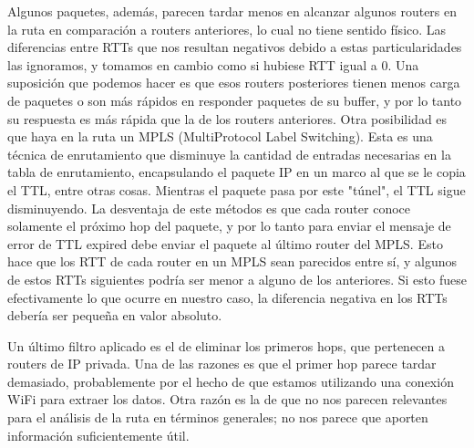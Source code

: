 Algunos paquetes, además, parecen tardar menos en alcanzar algunos routers en la
ruta en comparación a routers anteriores, lo cual no tiene sentido físico. Las
diferencias entre RTTs que nos resultan negativos debido a estas
particularidades las ignoramos, y tomamos en cambio como si hubiese RTT igual a
0. Una suposición que podemos hacer es que esos routers posteriores tienen menos
carga de paquetes o son más rápidos en responder paquetes de su buffer, y por lo
tanto su respuesta es más rápida que la de los routers anteriores.
Otra posibilidad es que haya en la ruta un MPLS 
(MultiProtocol Label Switching). Esta es una técnica de enrutamiento que
disminuye la cantidad de entradas necesarias en la tabla de enrutamiento,
encapsulando el paquete IP en un marco al que se le copia el TTL, entre otras
cosas. Mientras el paquete pasa por este "túnel", el TTL sigue disminuyendo.
La desventaja de este métodos es que cada router conoce
solamente el próximo hop del paquete, y por lo tanto para enviar el mensaje
de error de TTL expired debe enviar el paquete
al último router del MPLS. Esto hace que
los RTT de cada router en un MPLS sean parecidos entre sí, y algunos de estos
RTTs siguientes podría ser menor a alguno de los anteriores. Si esto fuese
efectivamente lo que ocurre en nuestro caso,
la diferencia negativa en los RTTs debería ser pequeña en valor absoluto.

Un último filtro aplicado es el de eliminar los primeros hops, que pertenecen
a routers de IP privada. Una de las razones es que el primer hop parece
tardar demasiado, probablemente por el hecho de que estamos utilizando una 
conexión WiFi para extraer los datos. Otra razón es la de que no nos parecen
relevantes para el análisis de la ruta en términos generales; no nos parece que
aporten información suficientemente útil.
